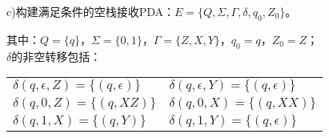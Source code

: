 \begin{solution}
c)构建满足条件的空栈接收PDA：$E=\{Q,\Sigma,\Gamma,\delta,q_0,Z_0\}$。

其中：$Q=\{q\}$，$\Sigma=\{0,1\}$，$\Gamma=\{Z,X,Y\}$，$q_0 = q$，$Z_0=Z$；\\
$\delta$的非空转移包括：\\
\begin{tabular}{ll}
    $\delta(q,\epsilon,Z) = \{(q,\epsilon)\}$
    &$\delta(q,\epsilon,Y) = \{(q,\epsilon)\}$\\
    $\delta(q,0,Z) = \{(q,XZ)\}$
    &$\delta(q,0,X) = \{(q,XX)\}$\\
    $\delta(q,1,X) = \{(q,Y)\}$
    &$\delta(q,1,Y) = \{(q,\epsilon)\}$
\end{tabular}
\end{solution}